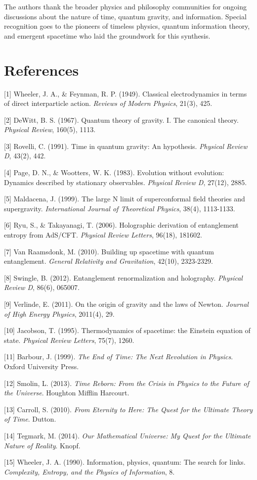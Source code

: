 \documentclass[12pt,a4paper]{article}
\begin{document}
The authors thank the broader physics and philosophy communities for ongoing discussions about the nature of time, quantum gravity, and information. Special recognition goes to the pioneers of timeless physics, quantum information theory, and emergent spacetime who laid the groundwork for this synthesis.

\section*{References}

[1] Wheeler, J. A., \& Feynman, R. P. (1949). Classical electrodynamics in terms of direct interparticle action. \textit{Reviews of Modern Physics}, 21(3), 425.

[2] DeWitt, B. S. (1967). Quantum theory of gravity. I. The canonical theory. \textit{Physical Review}, 160(5), 1113.

[3] Rovelli, C. (1991). Time in quantum gravity: An hypothesis. \textit{Physical Review D}, 43(2), 442.

[4] Page, D. N., \& Wootters, W. K. (1983). Evolution without evolution: Dynamics described by stationary observables. \textit{Physical Review D}, 27(12), 2885.

[5] Maldacena, J. (1999). The large N limit of superconformal field theories and supergravity. \textit{International Journal of Theoretical Physics}, 38(4), 1113-1133.

[6] Ryu, S., \& Takayanagi, T. (2006). Holographic derivation of entanglement entropy from AdS/CFT. \textit{Physical Review Letters}, 96(18), 181602.

[7] Van Raamsdonk, M. (2010). Building up spacetime with quantum entanglement. \textit{General Relativity and Gravitation}, 42(10), 2323-2329.

[8] Swingle, B. (2012). Entanglement renormalization and holography. \textit{Physical Review D}, 86(6), 065007.

[9] Verlinde, E. (2011). On the origin of gravity and the laws of Newton. \textit{Journal of High Energy Physics}, 2011(4), 29.

[10] Jacobson, T. (1995). Thermodynamics of spacetime: the Einstein equation of state. \textit{Physical Review Letters}, 75(7), 1260.

[11] Barbour, J. (1999). \textit{The End of Time: The Next Revolution in Physics}. Oxford University Press.

[12] Smolin, L. (2013). \textit{Time Reborn: From the Crisis in Physics to the Future of the Universe}. Houghton Mifflin Harcourt.

[13] Carroll, S. (2010). \textit{From Eternity to Here: The Quest for the Ultimate Theory of Time}. Dutton.

[14] Tegmark, M. (2014). \textit{Our Mathematical Universe: My Quest for the Ultimate Nature of Reality}. Knopf.

[15] Wheeler, J. A. (1990). Information, physics, quantum: The search for links. \textit{Complexity, Entropy, and the Physics of Information}, 8.
\end{document}
